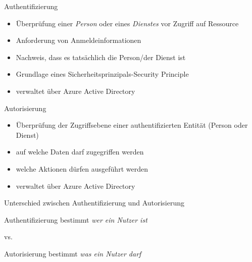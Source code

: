 
\begin{flashcard}[Definition]{Authentifizierung}
    \begin{itemize}
        \item Überprüfung einer \emph{Person} oder eines \emph{Dienstes} vor Zugriff auf Ressource
        \item Anforderung von Anmeldeinformationen
        \item Nachweis, dass es tatsächlich die Person/der Dienst ist
        \item Grundlage eines Sicherheitsprinzipals-Security Principle
        \item verwaltet über Azure Active Directory
    \end{itemize}
\end{flashcard}

\begin{flashcard}[Definition]{Autorisierung}
    \begin{itemize}
        \item Überprüfung der Zugriffsebene einer authentifizierten Entität (Person oder Dienst)
        \item auf welche Daten darf zugegriffen werden
        \item welche Aktionen dürfen ausgeführt werden
        \item verwaltet über Azure Active Directory
    \end{itemize}
\end{flashcard}

\begin{flashcard}[Verstehen]{Unterschied zwischen Authentifizierung und Autorisierung}
    \begin{center}
        Authentifizierung bestimmt \emph{wer ein Nutzer ist}
        \vspace{5mm}

        vs.
        \vspace{5mm}

        Autorisierung bestimmt \emph{was ein Nutzer darf}
    \end{center}
\end{flashcard}


